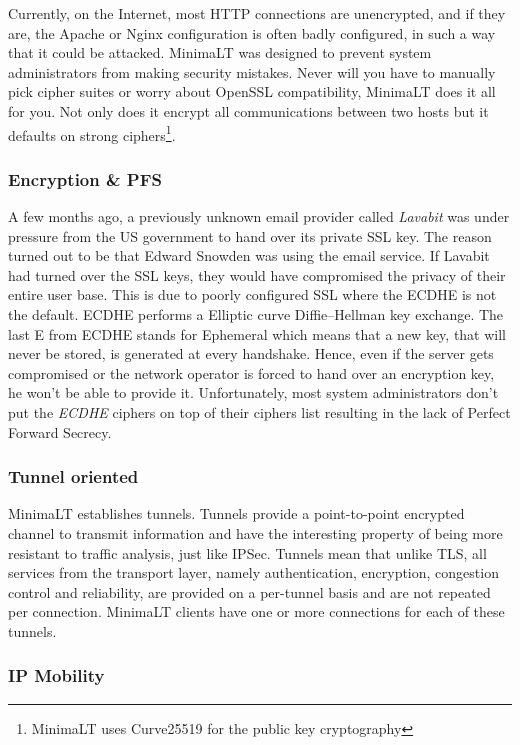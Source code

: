 \documentclass{vldb}
\begin{document}
Currently, on the Internet, most HTTP connections are unencrypted, and if they are, the Apache or Nginx configuration is often badly configured, in such a way that it could be attacked. MinimaLT was designed to prevent system administrators from making security mistakes. Never will you have to manually pick cipher suites or worry about OpenSSL compatibility, MinimaLT does it all for you. Not only does it encrypt all communications between two hosts but it defaults on strong ciphers\footnote{MinimaLT uses Curve25519 for the public key cryptography}.

\subsubsection{Encryption \& PFS}

A few months ago, a previously unknown email provider called \emph{Lavabit} was under pressure from the US government to hand over its private SSL key. The reason turned out to be that Edward Snowden was using the email service. If Lavabit had turned over the SSL keys, they would have compromised the privacy of their entire user base. This is due to poorly configured SSL where the ECDHE is not the default. ECDHE performs a Elliptic curve Diffie–Hellman key exchange. The last E from ECDHE stands for Ephemeral which means that a new key, that will never be stored, is generated at every handshake. Hence, even if the server gets compromised or the network operator is forced to hand over an encryption key, he won't be able to provide it. Unfortunately, most system administrators don't put the \emph{ECDHE} ciphers on top of their ciphers list resulting in the lack of Perfect Forward Secrecy.

\subsubsection{Tunnel oriented}

MinimaLT establishes tunnels. Tunnels provide a point-to-point encrypted channel to transmit information and have the interesting property of being more resistant to traffic analysis, just like IPSec. Tunnels mean that unlike TLS, all services from the transport layer, namely authentication, encryption, congestion control and reliability, are provided on a per-tunnel basis and are not repeated per connection. MinimaLT clients have one or more connections for each of these tunnels.

\subsubsection{IP Mobility}
\end{document}
